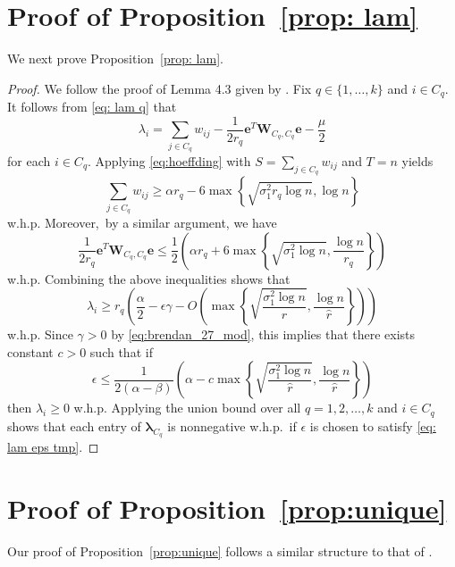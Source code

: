 \documentclass[twoside,11pt]{article}
\newcommand{\bs}{\boldsymbol}
\newcommand{\0}{\bs{0}}
\newcommand{\rbra}[1]{\ensuremath{\left( #1 \right)}} %
\newcommand{\bra}[1]{\ensuremath{\left\{ #1 \right\}}} %
\begin{document}
{%
\section{Proof of Proposition~\ref{prop: lam}}
\label{app: lam}
We next prove Proposition~\ref{prop: lam}.
\begin{proof}
We follow the proof of Lemma 4.3 given by \cite{ames2014guaranteed}. Fix $q \in \{1,\dots,k\}$ and $i \in C_q$.  
It follows from \eqref{eq: lam q} that 
\[
\lambda_i = \sum_{j \in C_q} w_{ij} - \frac{1}{2r_q}\bs{e}^T\bs{W}_{C_q,C_q}\bs{e}-\frac{\mu}{2}
\]
for each \(i \in C_q\).
Applying \eqref{eq:hoeffding} with ${S} = \sum_{j \in C_q} w_{ij}$ and $T = n$ yields
\[
	\sum_{j \in C_q} w_{ij} \geq \alpha r_q 
		- 6 \max \bra{ \sqrt{ \sigma_1^2 r_q \log n }, \log n}
\]
w.h.p. Moreover,~by a similar argument, we have
\[
	\frac{1}{2r_q}\bs{e}^T\bs{W}_{C_q,C_q}\bs{e} 
	\leq \frac{1}{2}\left(\alpha r_q + 
	6 \max\bra{ \sqrt{\sigma_1^2 \log n}, \frac{\log n}{r_q} }\right)
\]
w.h.p.
Combining the above inequalities shows that
\[
	\lambda_i \geq	r_q \rbra{ \frac{\alpha}{2} - \epsilon \gamma
		- O \rbra{ \max \bra{ \sqrt{  \frac{\sigma_1^2 \log n }{\hat r} },
			\frac{\log n }{\hat r} } } }
\]
w.h.p.
Since $\gamma > 0$ by \eqref{eq:brendan_27_mod}, this implies that 
there exists constant $c>0$ such that if
\begin{equation} \label{eq: lam eps tmp}
	\epsilon \leq \frac{1}{2(\alpha - \beta)}
	\rbra{ \alpha  - c \max \bra{ \sqrt{  \frac{\sigma_1^2 \log 		n }{\hat r} },
			\frac{\log n }{\hat r} } }
\end{equation}
then
$\lambda_i \geq 0$ w.h.p.
Applying the union bound over all \(q =1,2,\dots, k\) and
\(i\in C_q\) shows that each entry of $\bs{\lambda}_{C_q}$ is nonnegative w.h.p.~if \(\epsilon\) is chosen to satisfy \eqref{eq: lam eps tmp}.
\end{proof}

\section{Proof of Proposition~\ref{prop:unique}}
\label{A_unique}



Our proof of Proposition~\ref{prop:unique} follows a similar structure to that of \citet[Lemma~4.4]{ames2014guaranteed}.

}
\end{document}
